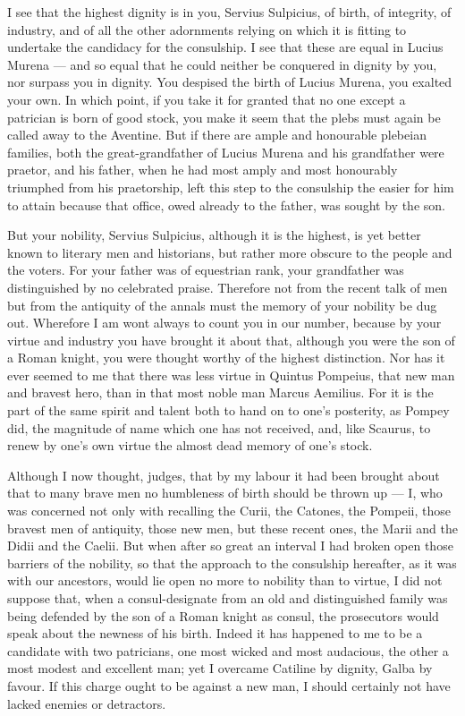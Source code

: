  I see that the highest dignity is in you, Servius Sulpicius, of birth, of integrity, of industry, and of all the other adornments relying on which it is fitting to undertake the candidacy for the consulship. I see that these are equal in Lucius Murena --- and so equal that he could neither be conquered in dignity by you, nor surpass you in dignity. You despised the birth of Lucius Murena, you exalted your own. In which point, if you take it for granted that no one except a patrician is born of good stock, you make it seem that the plebs must again be called away to the Aventine. But if there are ample and honourable plebeian families, both the great-grandfather of Lucius Murena and his grandfather were praetor, and his father, when he had most amply and most honourably triumphed from his praetorship, left this step to the consulship the easier for him to attain because that office, owed already to the father, was sought by the son.

 But your nobility, Servius Sulpicius, although it is the highest, is yet better known to literary men and historians, but rather more obscure to the people and the voters. For your father was of equestrian rank, your grandfather was distinguished by no celebrated praise. Therefore not from the recent talk of men but from the antiquity of the annals must the memory of your nobility be dug out. Wherefore I am wont always to count you in our number, because by your virtue and industry you have brought it about that, although you were the son of a Roman knight, you were thought worthy of the highest distinction. Nor has it ever seemed to me that there was less virtue in Quintus Pompeius, that new man and bravest hero, than in that most noble man Marcus Aemilius. For it is the part of the same spirit and talent both to hand on to one's posterity, as Pompey did, the magnitude of name which one has not received, and, like Scaurus, to renew by one's own virtue the almost dead memory of one's stock.

 Although I now thought, judges, that by my labour it had been brought about that to many brave men no humbleness of birth should be thrown up --- I, who was concerned not only with recalling the Curii, the Catones, the Pompeii, those bravest men of antiquity, those new men, but these recent ones, the Marii and the Didii and the Caelii. But when after so great an interval I had broken open those barriers of the nobility, so that the approach to the consulship hereafter, as it was with our ancestors, would lie open no more to nobility than to virtue, I did not suppose that, when a consul-designate from an old and distinguished family was being defended by the son of a Roman knight as consul, the prosecutors would speak about the newness of his birth. Indeed it has happened to me to be a candidate with two patricians, one most wicked and most audacious, the other a most modest and excellent man; yet I overcame Catiline by dignity, Galba by favour. If this charge ought to be against a new man, I should certainly not have lacked enemies or detractors.


